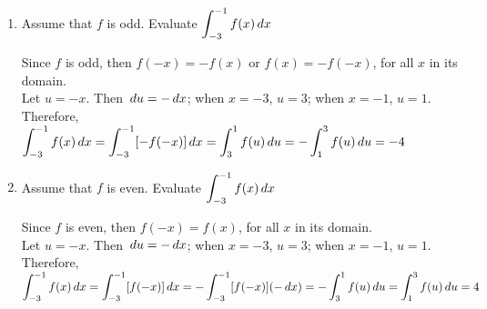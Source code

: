 \documentclass{ximera}
\begin{document}
\begin{problem}
\begin{enumerate}
\begin{enumerate}
\begin{explanation}
	    \end{explanation}
	\item $\displaystyle \int_{2}^{4} 3f(x-1)\d x$
\begin{explanation}
	  Let $u=x-1$. Then $\d u=\d x$; when $x=1$, $u=1$;  when $x=4$, $u=3$.
	    Therefore,\\[1em]
    	$\displaystyle \int_{2}^{4} 3f(x-1)\d x= \displaystyle \int_{1}^{3} 3f(u)\d u=3\displaystyle \int_{1}^{3} f(u)\d u=3\cdot4=12$
	    \end{explanation}
	\item $\displaystyle \int_{0}^{\sqrt{2}} 3x f(x^2+1)\d x$
\begin{explanation}
	  Let $u=x^2+1$. Then $\d u= 2x\d x$; when $x=0$, $u=1$; when $x=\sqrt{2}$, $u=3$.
	   Therefore,\\[1em]
	   $\displaystyle \int_{0}^{\sqrt{2}} 3x f(x^2+1)\d x=\displaystyle \int_{0}^{\sqrt{2}} 3\cdot \dfrac{2}{2}\cdot x f(x^2+1)\d x=\displaystyle \int_{1}^{3}  \dfrac{3}{2}\cdot  f(u)\d u= \dfrac{3}{2}\cdot \displaystyle \int_{1}^{3}  f(u)\d u= \dfrac{3}{2}\cdot 4=6$
	    \end{explanation}
	
	\end{enumerate}
\item Assume that $f$ is odd. Evaluate   $\displaystyle \int_{-3}^{-1} f(x)\,d x$
\begin{explanation}
  Since $f$ is odd, then $f(-x)=-f(x)$ or $f(x)=-f(-x)$, for all $x$ in its domain.\\
   Let $u=-x$. Then $\,d u=-\,d x$; when $x=-3$, $u=3$; when $x=-1$, $u=1$. \\[1em]
       Therefore,\\[1em]
  $\displaystyle \int_{-3}^{-1} f(x)\,d x=\displaystyle \int_{-3}^{-1}[ -f(-x)]\,d x=\displaystyle \int_{3}^{1}f(u)\,d u=-\displaystyle \int_{1}^{3}f(u)\,d u=-4$
  
    \end{explanation}
\item Assume that $f$ is even. Evaluate   $\displaystyle \int_{-3}^{-1} f(x)\,d x$
\begin{explanation}
   Since $f$ is even, then $f(-x)=f(x)$, for all $x$ in its domain.\\
   Let $u=-x$. Then $\,d u=-\,d x$; when $x=-3$, $u=3$; when $x=-1$, $u=1$. \\[1em]
       Therefore,\\[1em]
  $\displaystyle \int_{-3}^{-1} f(x)\,d x=\displaystyle \int_{-3}^{-1}[ f(-x)]\,d x=-\displaystyle \int_{-3}^{-1}[ f(-x)](-\,d x)=-\displaystyle \int_{3}^{1}f(u)\,d u=\displaystyle \int_{1}^{3}f(u)\,d u=4$
  

    \end{explanation}
\end{enumerate}
\end{problem}
\end{document}
